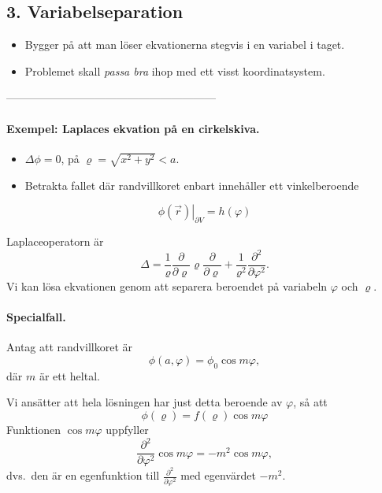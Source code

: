 \documentclass[%
oneside,                 %
final,                   %
10pt]{article}
\begin{document}
\subsection{3. Variabelseparation}

\begin{itemize}
\item Bygger på att man löser ekvationerna stegvis i en variabel i taget. 

\item Problemet skall \emph{passa bra} ihop med ett visst koordinatsystem.
\end{itemize}

\noindent
---------------------------------------------------------

\paragraph{Exempel: Laplaces ekvation på en cirkelskiva.}


\vspace{3mm}


\begin{itemize}
\item $\Delta\phi=0$, på $\varrho=\sqrt{x^2+y^2}<a$. 

\item Betrakta fallet där randvillkoret enbart innehåller ett vinkelberoende
\end{itemize}

\noindent
$$
\left. \phi(\vec{r}) \right|_{\partial V} = h(\varphi)
$$

Laplaceoperatorn är
$$
\Delta = \frac{1}{\varrho} \frac{\partial}{\partial \varrho} \varrho \frac{\partial}{\partial \varrho} +
 \frac{1}{\varrho^2} \frac{\partial^2}{\partial \varphi^2}.
$$
Vi kan lösa ekvationen genom att separera beroendet på variabeln $\varphi$ och
$\varrho$. 

\paragraph{Specialfall.}
Antag att randvillkoret är
$$
\phi(a,\varphi)=\phi_0\cos m\varphi,
$$ 
där $m$ är ett heltal.

Vi ansätter att hela lösningen har just detta beroende av $\varphi$, så att 
$$
\phi(\varrho)=f(\varrho)\cos m\varphi
$$
Funktionen $\cos m\varphi$ uppfyller 
$$
\frac{\partial ^2}{\partial \varphi^2} \cos m\varphi = -m^2 \cos m\varphi,
$$
dvs.~den är en egenfunktion till $\frac{\partial^2}{\partial \varphi^2}$ med egenvärdet $-m^2$. 
\end{document}
